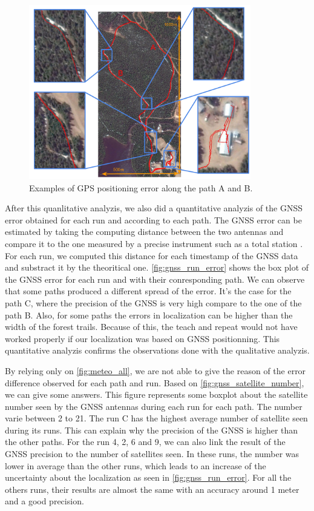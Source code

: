 \begin{figure} [htpb]
	\centering
	\includegraphics[height=3.0in]{./figs/GPS/FR_gps_data_fails2.pdf}
	\caption{Examples of GPS positioning error along the path A and B.}
	\label{fig:gnss_error_path}
\end{figure}

After this quanlitative analyzis, we also did a quantitative analyzis of the \ac{GNSS} error obtained for each run and according to each path.
The \ac{GNSS} error can be estimated by taking the computing distance between the two antennas and compare it to the one measured by a precise instrument such as a total station \citep{Vaidis2021}.
For each run, we computed this distance for each timestamp of the \ac{GNSS} data and substract it by the theoritical one.
\autoref{fig:gnss_run_error} shows the box plot of the \ac{GNSS} error for each run and with their conresponding path.
We can observe that some paths produced a different spread of the error.
It's the case for the path C, where the precision of the \ac{GNSS} is very high compare to the one of the path B.
Also, for some paths the errors in localization can be higher than the width of the forest trails.
Because of this, the teach and repeat would not have worked properly if our localization was based on \ac{GNSS} positionning.
This quantitative analyzis confirms the observations done with the qualitative analyzis.

By relying only on \autoref{fig:meteo_all}, we are not able to give the reason of the error difference observed for each path and run.
Based on \autoref{fig:gnss_satellite_number}, we can give some answers.
This figure represents some boxplot about the satellite number seen by the \ac{GNSS} antennas during each run for each path.
The number varie between 2 to 21.
The run C has the highest average number of satellite seen during its runs.
This can explain why the precision of the \ac{GNSS} is higher than the other paths.
For the run 4, 2, 6 and 9, we can also link the result of the \ac{GNSS} precision to the number of satellites seen.
In these runs, the number was lower in average than the other runs, which leads to an increase of the uncertainty about the localization as seen in \autoref{fig:gnss_run_error}.
For all the others runs, their results are almost the same with an accuracy around 1 meter and a good precision.

